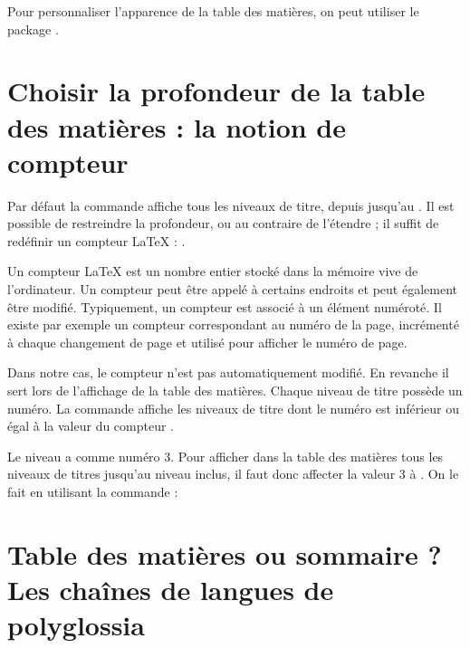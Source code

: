 \begin{plusloins}

Pour personnaliser l'apparence de la table des matières, on peut utiliser le package . 
\end{plusloins}

\section[Choix de la profondeur]{Choisir la profondeur de la table des matières : la notion de compteur}\label{tocdepth}

Par défaut la commande  affiche tous les niveaux de titre, depuis  jusqu'au . Il est possible de restreindre la profondeur, ou au contraire de l'étendre ; il suffit de redéfinir un compteur \LaTeX{} : .

Un compteur \LaTeX{} est un nombre entier stocké dans la mémoire vive de l'ordinateur. Un compteur peut être appelé à certains endroits et peut également être modifié. Typiquement, un compteur est associé à un élément numéroté. Il existe par exemple un compteur  correspondant au numéro de la page, incrémenté  à chaque changement de page et utilisé pour afficher le numéro de page.\label{compteur}

Dans notre cas, le compteur  n'est pas automatiquement modifié. En revanche il sert lors de l'affichage de la table des matières. Chaque niveau de titre possède un numéro. La commande  affiche les niveaux de titre dont le numéro est inférieur ou égal à la valeur du compteur .

Le niveau  a comme numéro 3. Pour afficher dans la table des matières tous les niveaux de titres jusqu'au niveau  inclus, il faut donc affecter la valeur 3 à  . On le fait en utilisant la commande  :

\begin{latexcode}
\setcounter{tocdepth}{3}
\tableofcontents
\end{latexcode}

\section[Table des matières ou sommaire ?]{Table des matières ou sommaire ? Les chaînes de langues de polyglossia}


